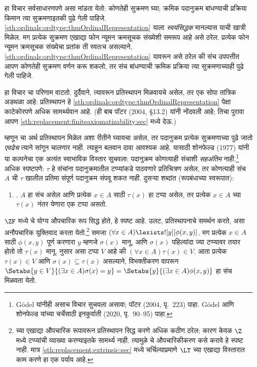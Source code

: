 हा विचार सर्वसाधारणपणे असा मांडता येतो: कोणतेही सुक्रमण घ्या; क्रमिक पदानुक्रम बांधण्याची प्रक्रिया किमान त्या सुक्रमणाइतकी पुढे गेली पाहिजे. \ref{sth:ordinals:ordtype:thmOrdinalRepresentation} याला \emph{स्वयंसिद्धक} मानल्यास याची खात्री मिळेल. मग प्रत्येक सुक्रमण एखाद्या फोन न्यूमन क्रमसूचक संख्येशी समरूप आहे असे ठरेल. प्रत्येक फोन न्यूमन क्रमसूचक संख्येचा प्रतांक ती स्वतःच असल्याने, \ref{sth:ordinals:ordtype:thmOrdinalRepresentation} यावरून असे ठरेल की संच उपपत्तीत आपण कोणतेही सुक्रमण वर्णन करू शकलो, तर संच बांधण्याची क्रमिक प्रक्रिया त्या सुक्रमणाच्याही पुढे गेली पाहिजे.

हा विचार \stagesinex{} चा परिणाम वाटतो. दुर्दैवाने, त्यावरून प्रतिस्थापन मिळवायचे असेल, तर एक सोपा तांत्रिक अडथळा आहे: प्रतिस्थापन हे \ref{sth:ordinals:ordtype:thmOrdinalRepresentation} पेक्षा काटेकोरपणे अधिक सामर्थ्यवान आहे. (ही बाब पॉटर (2004, \S13.2) यांनी नोंदवली आहे; तिचा पुरावा आपण \ref{sth:replacement:finiteaxiomatizability:sec} मध्ये देऊ.)

म्हणून \stagesinex{} चा अर्थ प्रतिस्थापन मिळेल अशा रीतीने घ्यायचा असेल, तर पदानुक्रम प्रत्येक सुक्रमणाच्या पुढे जातो \emph{एवढेच} त्याने सांगून चालणार नाही. त्याहून बलवान दावा आवश्यक आहे. यासाठी शोनफेल्ड (1977) यांनी या कल्पनेचा एक अत्यंत स्वाभाविक विस्तार सुचवला: पदानुक्रम कोणत्याही संचाशी \emph{सहअंतिम} नाही.\footnote{G\"odel यांनीही असाच विचार सुचवला असावा; पॉटर (2004, पृ.~223) पाहा. G\"odel आणि शोनफेल्ड यांच्या चर्चेसाठी इनकुर्वाती (2020, पृ.~90--95) पाहा.} अधिक स्पष्टपणे: $\tau$ हे संचांना पदानुक्रमातील टप्प्यांकडे पाठवणारे प्रतिचित्रण असेल, तर कोणत्याही संच $A$ ची $\tau$ खालील प्रतिमा संपूर्ण पदानुक्रम संपवू शकत नाही. दुसऱ्या शब्दांत (रूपबंधाच्या स्वरूपात):
\begin{enumerate}
  \item[] \stagescofin. $A$ हा संच असेल आणि प्रत्येक $x \in A$ साठी $\tau(x)$ हा टप्पा असेल, तर प्रत्येक $x \in A$ च्या $\tau(x)$ नंतर येणारा एक टप्पा असतो.
\end{enumerate}
$\ZF$ मध्ये \stagescofin{} चे योग्य औपचारिक रूप सिद्ध होते, हे स्पष्ट आहे. उलट, \stagescofin{} प्रतिस्थापनाचे समर्थन करते, असा अनौपचारिक युक्तिवाद करता येतो.\footnote{\stagescofin{} च्या एखाद्या औपचारिक रूपावरून प्रतिस्थापन सिद्ध करणे अधिक कठीण ठरेल; कारण केवळ $\Z$ मध्ये टप्प्यांची व्याख्या करण्याइतके सामर्थ्य नाही. त्यामुळे \stagescofin{} चे औपचारिकीकरण कसे करावे हे स्पष्ट नाही. मात्र \ref{sth:replacement:extrinsic:sec} मध्ये चर्चिल्याप्रमाणे $\LT$ च्या एखाद्या विस्तारात काम करणे हा एक पर्याय आहे.} समजा $(\forall x \in A)\lexists![y][\phi(x,y)]$. मग प्रत्येक $x \in A$ साठी $\phi(x,y)$ पूर्ण करणारा $y$ म्हणजे $\sigma(x)$ मानू, आणि $\sigma(x)$ पहिल्यांदा ज्या टप्प्यावर तयार होतो तो $\tau(x)$ मानू. \stagescofin{} नुसार असा टप्पा $V$ आहे की $(\forall x \in A)\tau(x)\in V$. आता प्रत्येक $\tau(x) \in V$ आणि $\sigma(x) \subseteq \tau(x)$ असल्याने, विभक्तीकरण वापरून $\Setabs{y
\in V}{(\exists x \in A)\sigma(x) = y} = \Setabs{y}{(\exists x \in
A)\phi(x,y)}$ हा संच मिळवता येतो.

